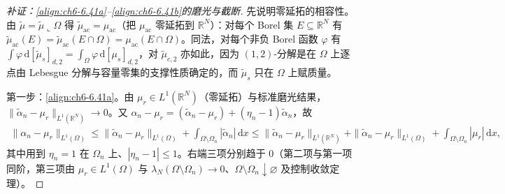 \documentclass[../../main.tex]{subfiles}%
\begin{document}
\begin{proof}[补证：\eqref{align:ch6-6.41a}--\eqref{align:ch6-6.41b}的磨光与截断]
先说明零延拓的相容性。由 $\widetilde\mu=\widetilde\mu\llcorner\Omega$ 得 $\widetilde\mu_{\mathrm{ac}}=\mu_{\mathrm{ac}}$（把 $\mu_{\mathrm{ac}}$ 零延拓到 $\mathbb{R}^N$）：对每个 Borel 集 $E\subseteq\mathbb{R}^N$ 有 $\widetilde\mu_{\mathrm{ac}}(E)=\widetilde\mu_{\mathrm{ac}}(E\cap\Omega)=\mu_{\mathrm{ac}}(E\cap\Omega)$。同法，对每个非负 Borel 函数 $\varphi$ 有 $\int\varphi\,\mathrm{d}[\widetilde\mu_s]_{d,2}=\int_\Omega\varphi\,\mathrm{d}[\mu_s]_{d,2}$，对 $\widetilde\mu_{c,2}$ 亦如此，因为 $(1,2)$-分解是在 $\Omega$ 上逐点由 Lebesgue 分解与容量零集的支撑性质确定的，而 $\widetilde\mu_s$ 只在 $\Omega$ 上赋质量。

第一步：\eqref{align:ch6-6.41a}。由 $\mu_r\in L^1(\mathbb{R}^N)$（零延拓）与标准磨光结果，$\|\widetilde\alpha_n-\mu_r\|_{L^1(\mathbb{R}^N)}\to0$。又 $\alpha_n-\mu_r=(\widetilde\alpha_n-\mu_r)+(\eta_n-1)\widetilde\alpha_n$，故
\begin{align*}
\|\alpha_n-\mu_r\|_{L^1(\Omega)}
\leqslant\|\widetilde\alpha_n-\mu_r\|_{L^1(\Omega)}
+\int_{\Omega\setminus\Omega_n}|\widetilde\alpha_n|\,\mathrm{d}x
\leqslant\|\widetilde\alpha_n-\mu_r\|_{L^1(\mathbb{R}^N)}
+\|\widetilde\alpha_n-\mu_r\|_{L^1(\Omega)}
+\int_{\Omega\setminus\Omega_n}|\mu_r|\,\mathrm{d}x,
\end{align*}
其中用到 $\eta_n=1$ 在 $\Omega_n$ 上、$|\eta_n-1|\leqslant1$。右端三项分别趋于 $0$（第二项与第一项同阶，第三项由 $\mu_r\in L^1(\Omega)$ 与 $\lambda_N(\Omega\setminus\Omega_n)\to0$、$\Omega\setminus\Omega_n\downarrow\varnothing$ 及控制收敛定理）。


\end{proof}
\end{document}
